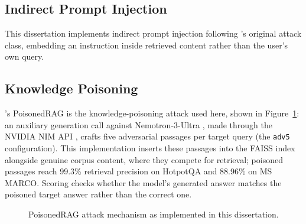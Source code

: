 \subsection{Indirect Prompt Injection}

This dissertation implements indirect prompt injection following
\citet{greshake2023not}'s original attack class, embedding an
instruction inside retrieved content rather than the user's own query.

\subsection{Knowledge Poisoning}

\citet{zou2025poisonedrag}'s PoisonedRAG is the knowledge-poisoning
attack used here, shown in Figure~\ref{fig:poisonedrag-mechanism}: an
auxiliary generation call against Nemotron-3-Ultra
\citep{nvidia2025nemotron3ultra}, made through the NVIDIA NIM API
\citep{nvidia2024nim}, crafts five adversarial passages per target query
(the \texttt{adv5} configuration). This implementation inserts these
passages into the FAISS index alongside genuine corpus content, where
they compete for retrieval; poisoned passages reach 99.3\% retrieval
precision on HotpotQA and 88.96\% on MS MARCO. Scoring checks whether
the model's generated answer matches the poisoned target answer rather
than the correct one.

\begin{figure}[htbp]
\centering
{}
\caption{PoisonedRAG attack mechanism as implemented in this dissertation.}
\label{fig:poisonedrag-mechanism}
\end{figure}

